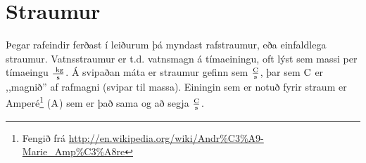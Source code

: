 \chapter{Straumur}
Þegar rafeindir ferðast í leiðurum þá myndast rafstraumur, eða einfaldlega
straumur. Vatnsstraumur er t.d. vatnsmagn á tímaeiningu, oft lýst sem
massi per tímaeingu $\frac{\textrm{ k}\textrm{g}}{\textrm{s}}$. Á svipaðan máta 
er straumur gefinn sem $\frac{\text{C}}{\textrm{s}}$, þar sem $\text{C}$ er
,,magnið'' af rafmagni (svipar til massa). Einingin sem er notuð fyrir
straum er Amperé\footnote{Fengið frá
\url{http://en.wikipedia.org/wiki/Andr\%C3\%A9-Marie_Amp\%C3\%A8re}}
($\textrm{A}$) sem er það sama og að segja $\frac{\textrm{C}}{\textrm{s}}$.


